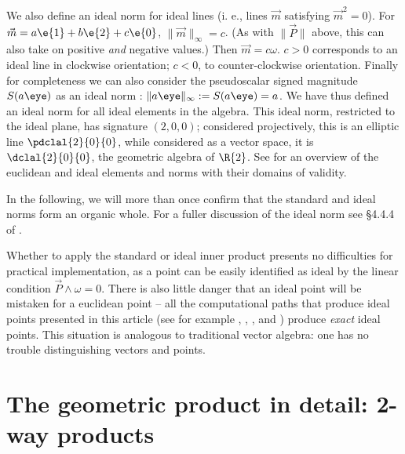 \documentclass{birkjour}
\newcommand{\gTh}{\cite{gunnThesis}\xspace}
\begin{document}
We also define an ideal norm for ideal lines (i. e., lines $\vec{m}$ satisfying $\vec{m}^2 = 0$).  For $\vec{m} =  a \e{1} + b \e{2} + c\e{0}$, $\| \vec{m} \|_\infty = c$. (As with $\| \vec{P} \|$ above, this can also take on positive \emph{and} negative values.) Then $\vec{m} = c\omega$.  $c>0$ corresponds to an ideal line in clockwise orientation; $c<0$, to counter-clockwise orientation.  Finally for completeness we can also consider the pseudoscalar signed magnitude $S(a\eye)$ as an ideal norm%
: $\| a\eye \|_\infty := S(a\eye) = a$.  We have thus defined an ideal norm for all ideal elements in the algebra.  This ideal norm, restricted to the ideal plane, has signature $(2,0,0)$; considered projectively, this is an elliptic line $\pdclal{2}{0}{0}$, while considered as a vector space, it is $\dclal{2}{0}{0}$,  the geometric algebra of $\R{2}$.  See  for an overview of the euclidean and ideal elements and norms with their domains of validity.  

In the following, we will  more than once confirm that the standard and ideal norms form an organic whole. For a fuller discussion of the ideal norm see \S 4.4.4 of \gTh.   


Whether to apply the standard or ideal inner product  presents no difficulties for practical implementation, as a point can be easily identified as ideal by the linear condition $\vec{P} \wedge \omega = 0$. There is also little danger that an ideal point will be mistaken for a euclidean point -- all the computational paths that produce ideal points presented in this article (see for example , , , and  ) produce \emph{exact} ideal points. %
This situation is analogous to traditional vector algebra: one has no trouble distinguishing vectors and points. 

  
 \section{The geometric product in detail: 2-way products}
\label{sec:gpdetail}
 
\end{document}
